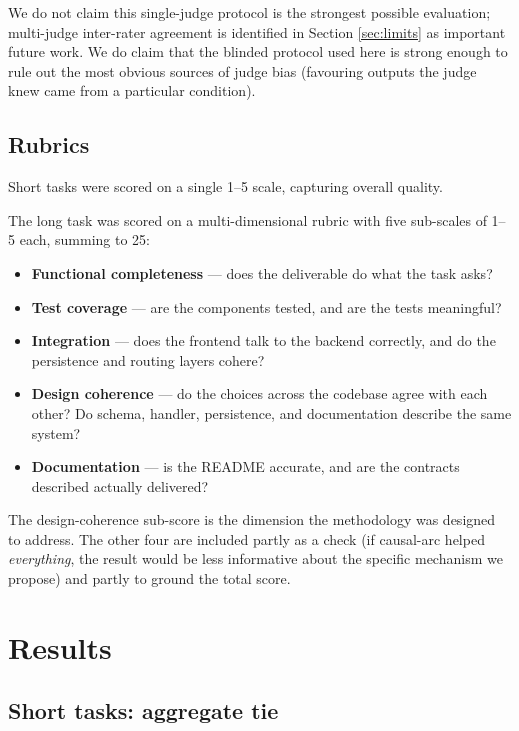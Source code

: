 \documentclass[11pt]{article}
\begin{document}
We do not claim this single-judge protocol is the strongest possible
evaluation; multi-judge inter-rater agreement is identified in
Section \ref{sec:limits} as important future work. We do claim that the
blinded protocol used here is strong enough to rule out the most obvious
sources of judge bias (favouring outputs the judge knew came from a
particular condition).

\subsection{Rubrics}

Short tasks were scored on a single 1--5 scale, capturing overall quality.

The long task was scored on a multi-dimensional rubric with five
sub-scales of 1--5 each, summing to 25:
\begin{itemize}[leftmargin=*,nosep]
  \item \textbf{Functional completeness} --- does the deliverable do what
  the task asks?
  \item \textbf{Test coverage} --- are the components tested, and are the
  tests meaningful?
  \item \textbf{Integration} --- does the frontend talk to the backend
  correctly, and do the persistence and routing layers cohere?
  \item \textbf{Design coherence} --- do the choices across the codebase
  agree with each other? Do schema, handler, persistence, and
  documentation describe the same system?
  \item \textbf{Documentation} --- is the README accurate, and are the
  contracts described actually delivered?
\end{itemize}

The design-coherence sub-score is the dimension the methodology was
designed to address. The other four are included partly as a check (if
causal-arc helped \emph{everything}, the result would be less informative
about the specific mechanism we propose) and partly to ground the total
score.

\section{Results}
\label{sec:results}

\subsection{Short tasks: aggregate tie}
\end{document}
